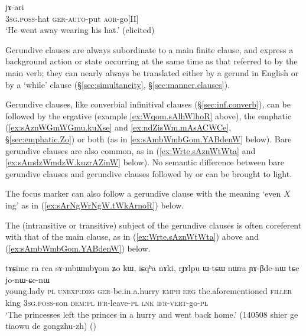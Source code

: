 \begin{exe}
\ex \label{ex:Wrte.sAznWtWta}
 jɤ-ari \\
\textsc{3sg}.\textsc{poss}-hat \textsc{ger}-\textsc{auto}-put \textsc{aor}-go[II] \\
\glt `He went away wearing his hat.' (elicited)
\end{exe}

Gerundive clauses are always subordinate to a main finite clause, and express a background action or state occurring at the same time as that referred to by the main verb; they can nearly always be translated either by a gerund in English or by a `while' clause (§\ref{sec:simultaneity}, §\ref{sec:manner.clauses}).

Gerundive clauses, like converbial infinitival clauses (§\ref{sec:inf.converb}), can be followed by the ergative  (example \ref{ex:Wqom.sAlhWlhoR} above), the emphatic  (\ref{ex:sAznWGmWGmu.kuXse} and \ref{ex:ndZisWm.mAsACWCe}, §\ref{sec:emphatic.Zo}) or both (as in \ref{ex:sAmbWmbGom.YABdenW} below). Bare gerundive clauses are also common, as in (\ref{ex:Wrte.sAznWtWta} and \ref{ex:sAmdzWmdzW.kuzrAZinW} below). No semantic difference between bare gerundive clauses and gerundive clauses followed by  or  can be brought to light. 

The focus marker  can also follow a gerundive clause with the meaning `even $X$ing' as in (\ref{ex:sArNgWrNgW.tWkArnoR}) below.

The (intransitive or transitive) subject of the gerundive clauses is often coreferent with that of the main clause, as in (\ref{ex:Wrte.sAznWtWta}) above and (\ref{ex:sAmbWmbGom.YABdenW}) below.

\begin{exe}
\ex \label{ex:sAmbWmbGom.YABdenW}
\gll tɤɕime ra rca sɤ-mbɯ\redp{}mbɣom ʑo kɯ, iɕqʰa nɤki, rɟɤlpu ɯ-tɕɯ nɯra ɲɤ-βde-nɯ tɕe jo-nɯ-ɕe-nɯ \\
young.lady \textsc{pl} \textsc{unexp}:\textsc{deg} \textsc{ger}-be.in.a.hurry \textsc{emph} \textsc{erg} the.aforementioned \textsc{filler} king \textsc{3sg}.\textsc{poss}-son \textsc{dem}:\textsc{pl} \textsc{ifr}-leave-\textsc{pl} \textsc{lnk} \textsc{ifr}-\textsc{vert}-go-\textsc{pl} \\
\glt `The princesses left the princes in a hurry and went back home.' (140508 shier ge tiaowu de gongzhu-zh) ()
\end{exe}


